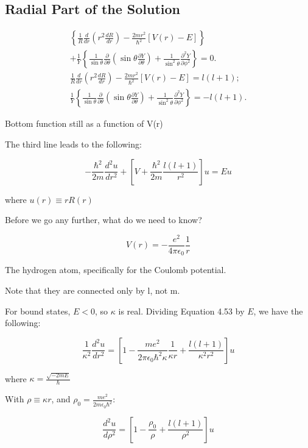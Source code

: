 \documentclass{article}
\begin{document}
\subsection{Radial Part of the Solution}



$$\begin{gathered}
\left\{\frac{1}{R} \frac{d}{d r}\left(r^{2} \frac{d R}{d r}\right)-\frac{2 m r^{2}}{\hbar^{2}}[V(r)-E]\right\} \\
+\frac{1}{Y}\left\{\frac{1}{\sin \theta} \frac{\partial}{\partial \theta}\left(\sin \theta \frac{\partial Y}{\partial \theta}\right)+\frac{1}{\sin ^{2} \theta} \frac{\partial^{2} Y}{\partial \phi^{2}}\right\}=0 . \\
\frac{1}{R} \frac{d}{d r}\left(r^{2} \frac{d R}{d r}\right)-\frac{2 m r^{2}}{\hbar^{2}}[V(r)-E]=l(l+1) ; \\
\frac{1}{Y}\left\{\frac{1}{\sin \theta} \frac{\partial}{\partial \theta}\left(\sin \theta \frac{\partial Y}{\partial \theta}\right)+\frac{1}{\sin ^{2} \theta} \frac{\partial^{2} Y}{\partial \phi^{2}}\right\}=-l(l+1) .
\end{gathered}$$


Bottom function still as a function of V(r)


The third line leads to the following:

$$- \frac{\hbar^2}{2m} \frac{d^2 u}{dr^2} + \left[ V + \frac{\hbar^2}{2m} \frac{l(l+1)}{r^2} \right] u = Eu$$

where $u(r) \equiv r R(r)$

Before we go any further, what do we need to know?

$$V(r) = - \frac{e^2}{4 \pi \epsilon_0} \frac{1}{r}$$

The hydrogen atom, specifically for the Coulomb potential.  

Note that they are connected only by l, not m. 

For bound states, $E < 0$, so $\kappa$ is real. Dividing Equation 4.53 by $E$, we have the following:

$$\frac{1}{\kappa^2} \frac{d^2 u}{dr^2} = \left[ 1 - \frac{me^2}{2 \pi \epsilon_0 \hbar^2 \kappa} \frac{1}{\kappa r} + \frac{l(l+1)}{\kappa^2 r^2} \right] u$$

where $\kappa = \frac{\sqrt{-2mE}}{\hbar}$

With $\rho \equiv \kappa r$, and $\rho_0 = \frac{me^2}{2m\epsilon_0 \hbar^2}$:

$$\frac{d^2 u}{d \rho^2} = \left[ 1 - \frac{\rho_0}{\rho} + \frac{l(l+1)}{\rho^2} \right] u$$
\end{document}
